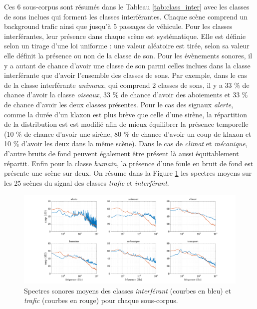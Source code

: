 Ces 6 sous-corpus sont résumés dans le Tableau \ref{tab:class_inter} avec les classes de sons inclues qui forment les classes interférantes. Chaque scène comprend un background trafic ainsi que jusqu'à 5 passages de véhicule.
Pour les classes interférantes, leur présence dans chaque scène est systématique. Elle est définie selon un tirage d'une loi uniforme : une valeur aléatoire est tirée, selon sa valeur elle définit la présence ou non de la classe de son. Pour les évènements sonores, il y a autant de chance d'avoir une classe de son parmi celles inclues dans la classe interférante que d'avoir l'ensemble des classes de sons. Par exemple, dans le cas de la classe interférante \textit{animaux}, qui comprend 2 classes de sons, il y a 33 $\%$ de chance d'avoir la classe \textit{oiseaux}, 33 $\%$ de chance d'avoir des aboiements et 33 $\%$ de chance d'avoir les deux classes présentes. Pour le cas des signaux \textit{alerte}, comme la durée d'un klaxon est plus brève que celle d'une sirène, la répartition de la distribution est est modifié afin de mieux équilibrer la présence temporelle (10 $\%$ de chance d'avoir une sirène, 80 $\%$ de chance d'avoir un coup de klaxon et 10 $\%$ d'avoir les deux dans la même scène).
Dans le cas de \textit{climat} et \textit{mécanique}, d'autre bruits de fond peuvent également être présent là aussi équitablement répartit. Enfin pour la classe \textit{humain}, la présence d'une foule en bruit de fond est présente une scène sur deux. 
On résume dans la Figure \ref{fig:spectre_moyen} les spectres moyens sur les 25 scènes du signal des classes \textit{trafic} et \textit{interférant}.

\begin{figure}[ht]
\centering
\includegraphics[width=\linewidth]{./figures/NMF/spectre_ambiance.pdf}
\caption{Spectres sonores moyens des classes \textit{interférant} (courbes en bleu) et \textit{trafic} (courbes en rouge) pour chaque sous-corpus.}
\label{fig:spectre_moyen}
\end{figure}


